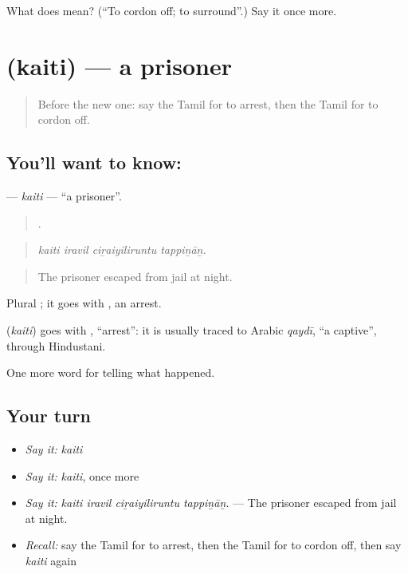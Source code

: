 \begin{tcolorbox}[breakable,colback=teal!4,colframe=teal!35!black,title={Before you move on}]
What does  mean? (\textquotedblleft{}To cordon off; to surround\textquotedblright{}.) Say it once more.
\end{tcolorbox}
\section[\texorpdfstring{\ta{கைதி} (kaiti)}{கைதி (kaiti)}]{ (kaiti) — a prisoner}

\label{lesson:TA-C296-kaiti}



\begin{quote}
Before the new one: say the Tamil for to arrest, then the Tamil for to cordon off.
\end{quote}

\subsection*{You'll want to know: }
\textbf{} — \emph{kaiti} — \textquotedblleft{}a prisoner\textquotedblright{}.

\begin{quote}
   .
\end{quote}

\begin{quote}
\emph{kaiti iravil ciṟaiyiliruntu tappiṉāṉ.}
\end{quote}

\begin{quote}
The prisoner escaped from jail at night.
\end{quote}

Plural ; it goes with , an arrest.

\begin{cousinweb}
\textbf{} (\emph{kaiti}) goes with , \textquotedblleft{}arrest\textquotedblright{}: it is usually traced to Arabic \emph{qaydī}, \textquotedblleft{}a captive\textquotedblright{}, through Hindustani.
\end{cousinweb}

\begin{grammarlens}[title={What you've built}]
One more word for telling what happened.
\end{grammarlens}

\subsection*{Your turn}
\begin{itemize}
\raggedright
  \item \emph{Say it:} \emph{kaiti}
  \item \emph{Say it:} \emph{kaiti}, once more
  \item \emph{Say it:} \emph{kaiti iravil ciṟaiyiliruntu tappiṉāṉ.} — The prisoner escaped from jail at night.
  \item \emph{Recall:} say the Tamil for to arrest, then the Tamil for to cordon off, then say \emph{kaiti} again
\end{itemize}

